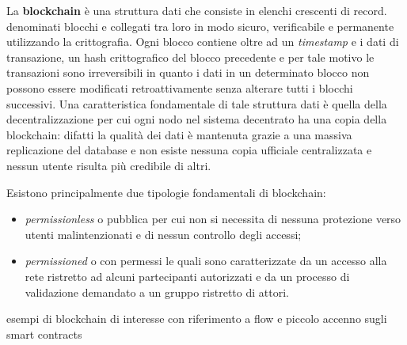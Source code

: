 La \textbf{blockchain} è una struttura dati che consiste in elenchi crescenti di record. denominati blocchi e collegati tra loro in modo sicuro, verificabile e permanente utilizzando la crittografia. Ogni blocco contiene oltre ad un \textit{timestamp} e i dati di transazione, un hash crittografico del blocco precedente e per tale motivo le transazioni sono irreversibili in quanto i dati in un determinato blocco non possono essere modificati retroattivamente senza alterare tutti i blocchi successivi. 
Una caratteristica fondamentale di tale struttura dati è quella della decentralizzazione per cui ogni nodo nel sistema decentrato ha una copia della blockchain: difatti la qualità dei dati è mantenuta grazie a una massiva replicazione del database e non esiste nessuna copia ufficiale centralizzata e nessun utente risulta più credibile di altri.

Esistono principalmente due tipologie fondamentali di blockchain:
\begin{itemize}
    \item \textit{permissionless} o pubblica per cui non si necessita di nessuna protezione verso utenti malintenzionati e di nessun controllo degli accessi;
    \item \textit{permissioned} o con permessi le quali sono caratterizzate da un accesso alla rete ristretto ad alcuni partecipanti autorizzati e da un processo di validazione demandato a un gruppo ristretto di attori.
\end{itemize}

esempi di blockchain di interesse con riferimento a flow e piccolo accenno sugli smart contracts